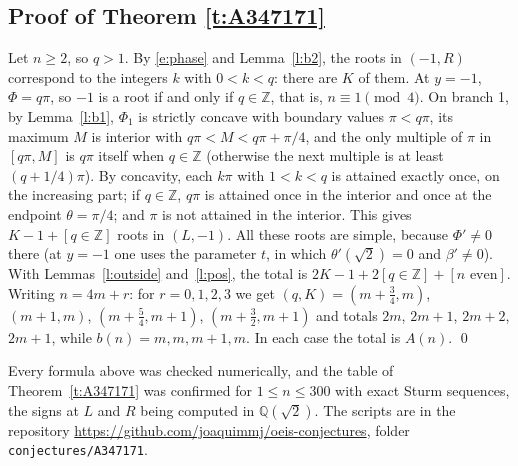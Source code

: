 \subsection{Proof of Theorem \ref{t:A347171}}
Let $n\ge2$, so $q>1$. By \eqref{e:phase} and Lemma~\ref{l:b2}, the roots in $(-1,R)$ correspond to the integers
$k$ with $0<k<q$: there are $K$ of them. At $y=-1$, $\Phi=q\pi$, so $-1$ is a root if and only if
$q\in\mathbb Z$, that is, $n\equiv1\pmod4$. On branch 1, by Lemma~\ref{l:b1}, $\Phi_1$ is strictly concave with
boundary values $\pi<q\pi$, its maximum $M$ is interior with $q\pi<M<q\pi+\pi/4$, and the only multiple of
$\pi$ in $[q\pi,M]$ is $q\pi$ itself when $q\in\mathbb Z$ (otherwise the next multiple is at least
$(q+1/4)\pi$). By concavity, each $k\pi$ with $1<k<q$ is attained exactly once, on the increasing part; if
$q\in\mathbb Z$, $q\pi$ is attained once in the interior and once at the endpoint $\theta=\pi/4$; and $\pi$ is
not attained in the interior. This gives $K-1+[q\in\mathbb Z]$ roots in $(L,-1)$. All these roots are simple,
because $\Phi'\ne0$ there (at $y=-1$ one uses the parameter $t$, in which $\theta'(\sqrt2)=0$ and $\beta'\ne0$).
With Lemmas~\ref{l:outside} and~\ref{l:pos}, the total is $2K-1+2[q\in\mathbb Z]+[n\text{ even}]$.
Writing $n=4m+r$: for $r=0,1,2,3$ we get $(q,K)=(m+\tfrac34,m)$, $(m+1,m)$, $(m+\tfrac54,m+1)$,
$(m+\tfrac32,m+1)$ and totals $2m$, $2m+1$, $2m+2$, $2m+1$, while $b(n)=m,m,m+1,m$. In each case the total
is $A(n)$. \qed


\begin{remark}
Every formula above was checked numerically, and the table of Theorem~\ref{t:A347171} was confirmed for
$1\le n\le300$ with exact Sturm sequences, the signs at $L$ and $R$ being computed in $\mathbb Q(\sqrt2)$.
The scripts are in the repository \url{https://github.com/joaquimmj/oeis-conjectures}, folder
\texttt{conjectures/A347171}.
\end{remark}

